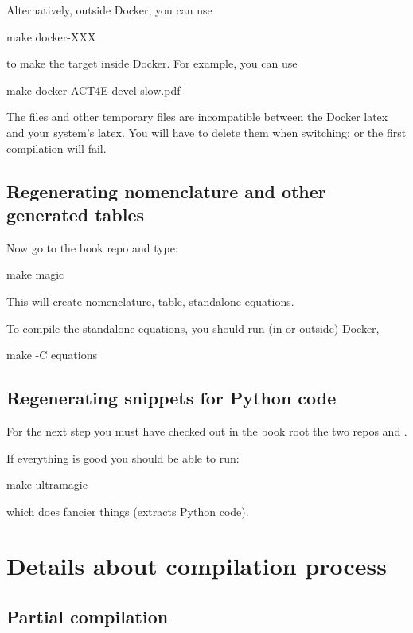 Alternatively, outside Docker, you can use
\begin{console}
    make docker-XXX
\end{console}
to make the target  inside Docker.
For example, you can use
\begin{console}
    make docker-ACT4E-devel-slow.pdf
\end{console}
%

\begin{remark}
    The  files and other temporary files are incompatible between the Docker latex and your system's latex.
    You will have to delete them when switching; or the first compilation will fail.
\end{remark}

\subsection{Regenerating nomenclature and other generated tables}

Now go to the book repo and type:
%
\begin{console}
    make magic
\end{console}
%
This will create nomenclature, table, standalone equations.

To compile the standalone equations, you should run (in or outside) Docker,
%
\begin{console}
    make -C equations
\end{console}

\subsection{Regenerating snippets for Python code}

For the next step you must have checked out in the book root the two repos  and .

If everything is good you should be able to run:
%
\begin{console}
    make ultramagic
\end{console}
%
which does fancier things (extracts Python code).

\section{Details about compilation process}

\subsection{Partial compilation}

